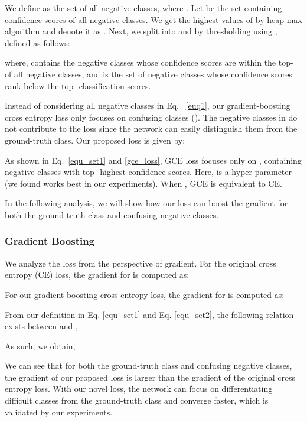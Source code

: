 \documentclass[letterpaper]{article} \usepackage{aaai20}  \usepackage{times}  \usepackage{helvet} \usepackage{courier}  \usepackage[hyphens]{url}  \usepackage{graphicx} \usepackage{multirow}
\begin{document}
We define  as the set of all negative classes, where . Let  be the set containing confidence scores of all negative classes. We get the  highest values of  by heap-max algorithm \cite{max_heap} and denote it as . Next, we split  into  and  by thresholding  using , defined as follows:


where,  contains the negative classes whose confidence scores are within the top- of all negative classes, and  is the set of negative classes whose confidence scores rank below the top- classification scores.  

Instead of considering all negative classes in Eq.~ \ref{euq1}, our gradient-boosting cross entropy loss only focuses on confusing classes (). The negative classes in  do not contribute to the loss since the network can easily distinguish them from the ground-truth class. Our proposed loss is given by:


As shown in Eq.~\ref{equ_set1} and \ref{gce_loss}, GCE loss focuses only on , containing  negative classes with top- highest confidence scores. Here,  is a hyper-parameter (we found  works best in our experiments). When , GCE is equivalent to CE. 

In the following analysis, we will show how our loss can boost the gradient for both the ground-truth class and confusing negative classes.




\subsubsection{Gradient Boosting}
We analyze the loss from the perspective of gradient. For the original cross entropy (CE) loss, the gradient for  is computed as:

For our gradient-boosting cross entropy loss, the gradient for  is computed as:

From our definition in Eq. \ref{equ_set1} and Eq. \ref{equ_set2}, the following relation exists between  and ,

As such, we obtain,


We can see that for both the ground-truth class and confusing negative classes, the gradient of our proposed loss is larger than the gradient of the original cross entropy loss. With our novel loss, the network can focus on differentiating difficult classes from the ground-truth class and converge faster, which is validated by our experiments.
\end{document}
